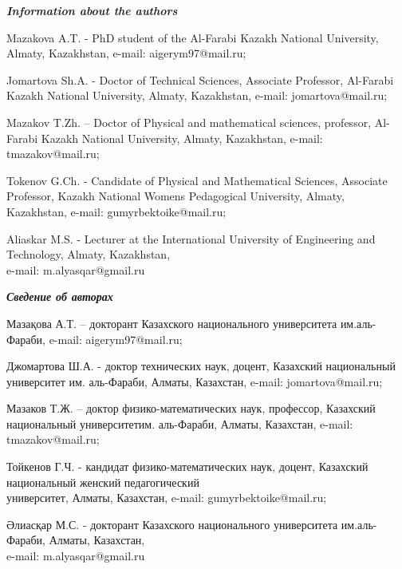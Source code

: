 \emph{{\bfseries Information about the authors}}

\begin{noparindent}

Mazakova A.T. - PhD student of the Al-Farabi Kazakh National University,
Almaty, Kazakhstan, e-mail: aigerym97@mail.ru;

Jomartova Sh.A. - Doctor of Technical Sciences, Associate Professor,
Al-Farabi Kazakh National University, Almaty, Kazakhstan, e-mail:
jomartova@mail.ru;

Mazakov T.Zh. -- Doctor of Physical and mathematical sciences,
professor, Al-Farabi Kazakh National University, Almaty, Kazakhstan,
e-mail: tmazakov@mail.ru;

Tokenov G.Ch. - Candidate of Physical and Mathematical Sciences,
Associate Professor, Kazakh National Women\textquotesingle s Pedagogical
University, Almaty, Kazakhstan, e-mail: gumyrbektoike@mail.ru;

Aliaskar M.S. - Lecturer at the International University of Engineering
and Technology, Almaty, Kazakhstan, \\e-mail: m.alyasqar@gmail.ru
\end{noparindent}

\emph{{\bfseries Сведение об авторах}}
\begin{noparindent}

Мазақова А.Т. -- докторант Казахского национального университета
им.аль-Фараби, e-mail: aigerym97@mail.ru;

Джомартова Ш.А. - доктор технических наук, доцент, Казахский
национальный университет им. аль-Фараби, Алматы, Казахстан, e-mail:
jomartova@mail.ru;

Мазаков Т.Ж. -- доктор физико-математических наук, профессор, Казахский
национальный университетим. аль-Фараби, Алматы, Казахстан, e-mail:
tmazakov@mail.ru;

Тойкенов Г.Ч. - кандидат физико-математических наук, доцент, Казахский
национальный женский педагогический \\университет, Алматы, Казахстан,
e-mail: gumyrbektoike@mail.ru;

Әлиасқар М.С. - докторант Казахского национального университета
им.аль-Фараби, Алматы, Казахстан, \\e-mail: m.alyasqar@gmail.ru
\end{noparindent}

